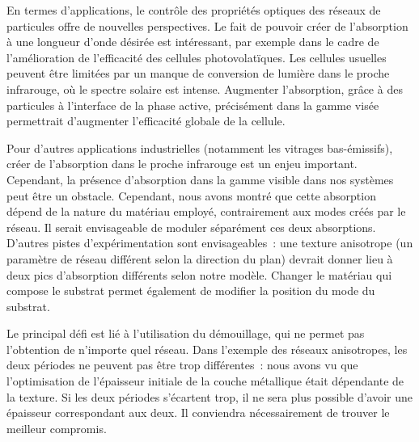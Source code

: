 En termes d'applications, le contrôle des propriétés optiques des réseaux de particules offre de nouvelles perspectives. Le fait de pouvoir créer de l'absorption à une longueur d'onde désirée est intéressant, par exemple dans le cadre de l'amélioration de l'efficacité des cellules photovolatïques. Les cellules usuelles peuvent être limitées par un manque de conversion de lumière dans le proche infrarouge, où le spectre solaire est intense. Augmenter l'absorption, grâce à des particules à l'interface de la phase active, précisément dans la gamme visée permettrait d'augmenter l'efficacité globale de la cellule.\par 
Pour d'autres applications industrielles (notamment les vitrages bas-émissifs), créer de l'absorption dans le proche infrarouge est un enjeu important. Cependant, la présence d'absorption dans la gamme visible dans nos systèmes peut être un obstacle. Cependant, nous avons montré que cette absorption dépend de la nature du matériau employé, contrairement aux modes créés par le réseau. Il serait envisageable de moduler séparément ces deux absorptions. D'autres pistes d'expérimentation sont envisageables~: une texture anisotrope (un paramètre de réseau différent selon la direction du plan) devrait donner lieu à deux pics d'absorption différents selon notre modèle. Changer le matériau qui compose le substrat permet également de modifier la position du mode du substrat.\par 
Le principal défi est lié à l'utilisation du démouillage, qui ne permet pas l'obtention de n'importe quel réseau. Dans l'exemple des réseaux anisotropes, les deux périodes ne peuvent pas être trop différentes~: nous avons vu que l'optimisation de l'épaisseur initiale de la couche métallique était dépendante de la texture. Si les deux périodes s'écartent trop, il ne sera plus possible d'avoir une épaisseur correspondant aux deux. Il conviendra nécessairement de trouver le meilleur compromis.\par 


\newpage


